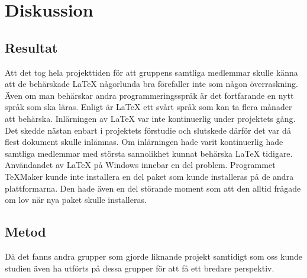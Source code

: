 \section{Diskussion}
\subsection{Resultat}
Att det tog hela projekttiden för att gruppens samtliga medlemmar skulle känna att de behärskade {\LaTeX} någorlunda bra förefaller inte som någon överraskning. Även om man behärskar andra programmeringsspråk är det fortfarande en nytt språk som ska läras. Enligt \citep{latexandfriends} är {\LaTeX} ett svårt språk som kan ta flera månader att behärska. 
\newline
\newline
Inlärningen av {\LaTeX} var inte kontinuerlig under projektets gång. Det skedde nästan enbart i projektets förstudie och slutskede därför det var då flest dokument skulle inlämnas. Om inlärningen hade varit kontinuerlig hade samtliga medlemmar med största sannolikhet kunnat behärska {\LaTeX} tidigare.
\newline
\newline
Användandet av {\LaTeX} på Windows innebar en del problem. Programmet TeXMaker kunde inte installera en del paket som kunde installeras på de andra plattformarna. Den hade även en del störande moment som att den alltid frågade om lov när nya paket skulle installeras.  
 
\subsection{Metod}
Då det fanns andra grupper som gjorde liknande projekt samtidigt som oss kunde studien även ha utförts på dessa grupper för att få ett bredare perspektiv. 